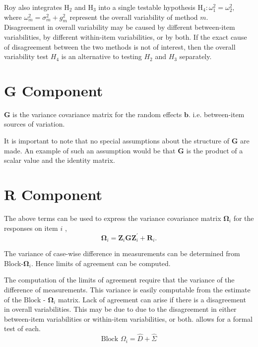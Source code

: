 \documentclass[12pt, a4paper]{report}
\theoremstyle{plain}
\theoremstyle{definition}
\theoremstyle{remark}
\begin{document}
Roy also integrates $\mathrm{H}_2$ and $\mathrm{H}_3$ into a single testable hypothesis $\mathrm{H}_4\colon \omega^2_1=\omega^2_2,$ where $\omega^2_m = \sigma^2_m + g^2_m$ represent the overall variability of method $m.$ \\
\bigskip
Disagreement in overall variability may be caused by different between-item variabilities, by different within-item variabilities, or by both.  If the exact cause of disagreement between the two methods is not of interest, then the overall variability test $H_4$ is an alternative to testing $H_2$ and $H_3$ separately.


\section{G Component}


$\boldsymbol{G}$ is the variance covariance matrix for the random effects $\boldsymbol{b}$.
i.e. between-item sources of variation.  

It is important to note that no special assumptions about the structure of $\boldsymbol{G}$ are made. An example of such an assumption would be that $\boldsymbol{G}$ is the product of a scalar value and the identity matrix.





\section{R Component}

The above terms can be used to express the  variance covariance matrix $\boldsymbol{\Omega}_i$ for the responses on item $i$ ,
\[
\boldsymbol{\Omega}_i = \boldsymbol{Z}_i \boldsymbol{G} \boldsymbol{Z}_i^{\prime} + \boldsymbol{R}_i.
\]



The variance of case-wise difference in measurements can be determined from Block-$\boldsymbol{\Omega}_{i}$. Hence limits of agreement can be computed.

The computation of the limits of agreement require that the variance of the difference of measurements. This variance is easily computable from the estimate of the ${\mbox{Block - }\boldsymbol \Omega_{i}}$ matrix. Lack of agreement can arise if there is a disagreement in overall variabilities. This may be due to due to the disagreement in either between-item
variabilities or within-item variabilities, or both. \citet{ARoy2009} allows for a formal test of each.
\begin{equation}
\mbox{Block  }\Omega_{i} = \hat{D} + \hat{\Sigma}
\end{equation}
\end{document}
